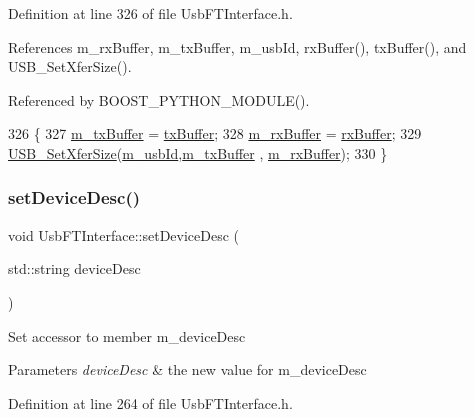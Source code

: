 Definition at line 326 of file Usb\+F\+T\+Interface.\+h.



References m\+\_\+rx\+Buffer, m\+\_\+tx\+Buffer, m\+\_\+usb\+Id, rx\+Buffer(), tx\+Buffer(), and U\+S\+B\+\_\+\+Set\+Xfer\+Size().



Referenced by B\+O\+O\+S\+T\+\_\+\+P\+Y\+T\+H\+O\+N\+\_\+\+M\+O\+D\+U\+L\+E().


\begin{DoxyCode}
326                                               \{
327     \hyperlink{classUsbFTInterface_a10385649160531f6976d55176bee1f2d}{m\_txBuffer} = \hyperlink{classUsbFTInterface_acac73d3fc1587437656bb7fe24e10906}{txBuffer};
328     \hyperlink{classUsbFTInterface_a7007c5112d381f5caefa133a42bd900d}{m\_rxBuffer} = \hyperlink{classUsbFTInterface_a836d1a8d181fd49e11235bb677e3fa7e}{rxBuffer};
329     \hyperlink{LALUsbML_8h_a671ccd24a9539d26bae5926a06662129}{USB\_SetXferSize}(\hyperlink{classUsbFTInterface_a91df5c0547e8be460bc087e27afe05aa}{m\_usbId},\hyperlink{classUsbFTInterface_a10385649160531f6976d55176bee1f2d}{m\_txBuffer} , 
      \hyperlink{classUsbFTInterface_a7007c5112d381f5caefa133a42bd900d}{m\_rxBuffer});
330   \}
\end{DoxyCode}
\mbox{\label{classUsbFTInterface_abb106a3d2c48826f96ec2ac10d029132}} 
\subsubsection{\texorpdfstring{set\+Device\+Desc()}{setDeviceDesc()}}
{\footnotesize\ttfamily void Usb\+F\+T\+Interface\+::set\+Device\+Desc (\begin{DoxyParamCaption}\item[{std\+::string}]{device\+Desc }\end{DoxyParamCaption})\hspace{0.3cm}{\ttfamily [inline]}}

Set accessor to member m\+\_\+device\+Desc 
\begin{DoxyParams}{Parameters}
{\em device\+Desc} & the new value for m\+\_\+device\+Desc \\
\hline
\end{DoxyParams}


Definition at line 264 of file Usb\+F\+T\+Interface.\+h.



